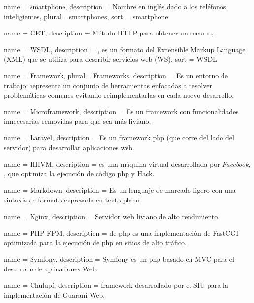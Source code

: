  {
  name = {smartphone},
  description = {Nombre en inglés dado a los teléfonos inteligientes},
  plural= {smartphones},
  sort = {smartphone}
}

 {
  name = {GET},
  description = {Método HTTP para obtener un recurso},
}

 {
  name = {WSDL},
  description = {, es un formato del Extensible Markup Language (XML) que se utiliza para describir servicios web (WS)},
  sort = {WSDL}
}

 {
  name = {Framework},
  plural= {Frameworks},
  description = {Es un entorno de trabajo: representa un conjunto de herramientas enfocadas a resolver problemáticas comunes evitando reimplementarlas en cada nuevo desarrollo.}
}

 {
  name = {Microframework},
  description = {Es un \gls{framework} con funcionalidades innecesarias removidas para que sea más liviano.}
}


 {
  name = {Laravel},
  description = {Es un \gls{framework} \gls{php} (que corre del lado del servidor) para desarrollar aplicaciones web.}
}

 {
  name = {HHVM},
  description = { es una máquina virtual desarrollada por \textit{Facebook}, , que optimiza la ejecución de código \gls{php} y Hack.}
}

 {
  name = {Markdown},
  description = {Es un lenguaje de marcado ligero con una sintaxis de formato expresada en texto plano}
}

 {
  name = {Nginx},
  description = {Servidor web liviano de alto rendimiento.}
}

 {
  name = {PHP-FPM},
  description = { de \gls{php} es una implementación de FastCGI optimizada para la ejecución de \gls{php} en sitios de alto tráfico.}
}

 {
  name = {Symfony},
  description = {Symfony es un  \gls{php} basado en MVC para el desarrollo de aplicaciones Web.}
}

 {
  name = {Chulupí},
  description = {\gls{framework} desarrollado por el SIU para la implementación de Guaraní Web.}
}

